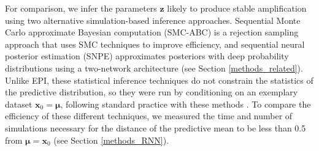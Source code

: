 \documentclass[11pt]{article}
\begin{document}
For comparison, we infer the parameters $\mathbf{z}$ likely to produce stable amplification using two alternative simulation-based inference approaches.
Sequential Monte Carlo approximate Bayesian computation (SMC-ABC) \cite{sisson2007sequential} is a rejection sampling approach that uses SMC techniques to improve efficiency, and sequential neural posterior estimation (SNPE) \cite{gonccalves2019training} approximates posteriors with deep probability distributions using a two-network architecture (see Section \ref{methods_related}).
Unlike EPI, these statistical inference techniques do not constrain the statistics of the predictive distribution, so they were run by conditioning on an exemplary dataset  $\mathbf{x}_0 = \bm{\mu}$, following standard practice with these methods \cite{sisson2007sequential, gonccalves2019training}.
To compare the efficiency of these different techniques, we measured the time and number of simulations necessary for the distance of the predictive mean to be less than 0.5 from $\bm{\mu} = \mathbf{x}_0$ (see Section \ref{methods_RNN}).
\end{document}
